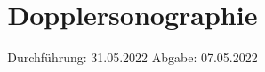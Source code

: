 

\subject{US 3}
\title{Dopplersonographie}
\date{%
  Durchführung: 31.05.2022
  \hspace{3em}
  Abgabe: 07.05.2022
}



\maketitle
\thispagestyle{empty}
\tableofcontents
\newpage






\printbibliography{}


